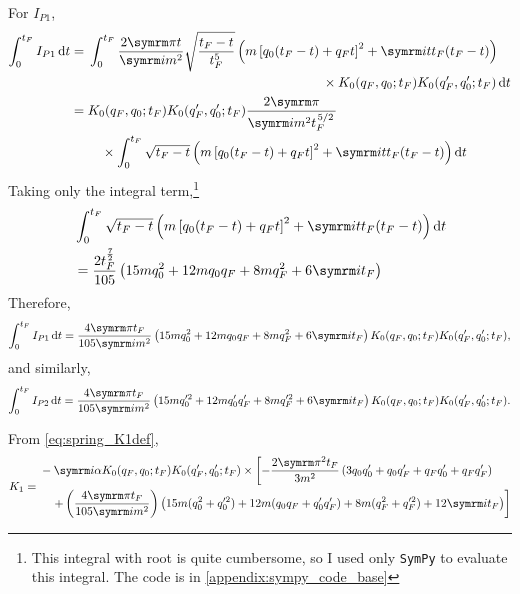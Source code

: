 For $I_{P1}$,
\begin{align}
    \int_0^{t_F} I_{P1}\dd{t} &= \begin{multlined}[t]
        \int_0^{t_F}\frac{2\cpi t}{\im m^2}\sqrt{\frac{t_F - t}{t_F^5}}\left(m\left[q_0(t_F - t) + q_Ft\right]^2 + \im tt_F(t_F - t)\right) \\ \times K_0(q_F, q_0; t_F)K_0(q_F', q_0'; t_F)\dd{t}
    \end{multlined} \\
    &= \begin{multlined}[t]
        K_0(q_F, q_0; t_F)K_0(q_F', q_0'; t_F)\frac{2\cpi}{\im m^2t_F^{\flatfrac{5}{2}}} \\ \times \int_0^{t_F} \sqrt{t_F - t}\left(m\left[q_0(t_F - t) + q_Ft\right]^2 + \im tt_F(t_F - t)\right)\dd{t}
    \end{multlined}
\end{align}
Taking only the integral term,\footnote{This integral with root is quite cumbersome, so I used only \texttt{SymPy} to evaluate this integral. The code is in \cref{appendix:sympy_code_base}}
\begin{align}
    &\int_0^{t_F} \sqrt{t_F - t}\left(m\left[q_0(t_F - t) + q_Ft\right]^2 + \im tt_F(t_F - t)\right)\dd{t} \\
    &= \frac{2t_F^{\frac{7}{2}}}{105} \left(15mq_0^2 + 12mq_0q_F + 8mq_F^2 + 6\im t_F\right)
\end{align}
Therefore,
\begin{equation}
    \int_0^{t_F}I_{P1}\dd{t} = \frac{4\cpi t_F}{105\im m^2}\left(15mq_0^2 + 12mq_0q_F + 8mq_F^2 + 6\im t_F\right)K_0(q_F, q_0; t_F)K_0(q_F', q_0'; t_F),
\end{equation}
and similarly,
\begin{equation}
    \int_0^{t_F}I_{P2}\dd{t} = \frac{4\cpi t_F}{105\im m^2}\left(15mq_0'^2 + 12mq_0'q_F' + 8mq_F'^2 + 6\im t_F\right)K_0(q_F, q_0; t_F)K_0(q_F', q_0'; t_F).
\end{equation}

From \cref{eq:spring_K1def},
\begin{align}
    K_1 = \begin{multlined}
        -\im\alpha K_0(q_F, q_0; t_F)K_0(q_F', q_0'; t_F)
        \times \left[-\frac{2\cpi^2t_F}{3m^2}\left(3q_0q_0' + q_0q_F' + q_Fq_0' + q_Fq_F'\right) \right. \\ \left. + \left(\frac{4\cpi t_F}{105\im m^2}\right)\left(15m(q_0^2 + q_0'^2) + 12m(q_0q_F + q_0'q_F') + 8m(q_F^2 + q_F'^2) + 12\im t_F\right)\right]
    \end{multlined}
\end{align}

